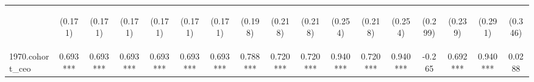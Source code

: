\begin{center}
\begin{tabular}{lcccccccccccccccc}
\vspace{4pt} & \begin{footnotesize}(0.171)\end{footnotesize} & \begin{footnotesize}(0.171)\end{footnotesize} & \begin{footnotesize}(0.171)\end{footnotesize} & \begin{footnotesize}(0.171)\end{footnotesize} & \begin{footnotesize}(0.171)\end{footnotesize} & \begin{footnotesize}(0.171)\end{footnotesize} & \begin{footnotesize}(0.198)\end{footnotesize} & \begin{footnotesize}(0.218)\end{footnotesize} & \begin{footnotesize}(0.218)\end{footnotesize} & \begin{footnotesize}(0.254)\end{footnotesize} & \begin{footnotesize}(0.218)\end{footnotesize} & \begin{footnotesize}(0.254)\end{footnotesize} & \begin{footnotesize}(0.299)\end{footnotesize} & \begin{footnotesize}(0.239)\end{footnotesize} & \begin{footnotesize}(0.291)\end{footnotesize} & \begin{footnotesize}(0.346)\end{footnotesize} \\
1970.cohort\_ceo & 0.693*** & 0.693*** & 0.693*** & 0.693*** & 0.693*** & 0.693*** & 0.788*** & 0.720*** & 0.720*** & 0.940*** & 0.720*** & 0.940*** & -0.265 & 0.692*** & 0.940*** & 0.0288 \\

\end{tabular}
\end{center}

